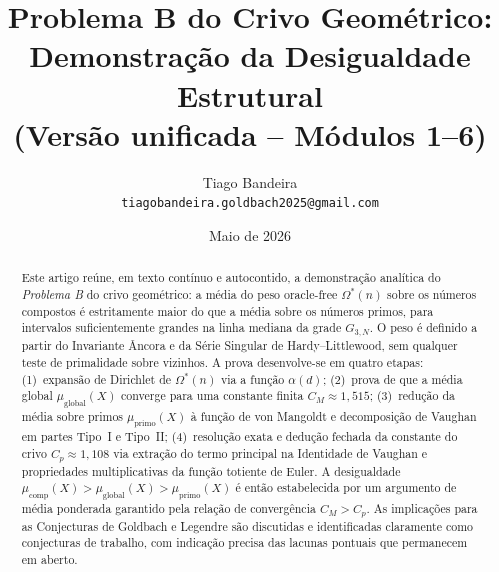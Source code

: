 \documentclass[12pt]{article}
\title{%
	Problema B do Crivo Geométrico:\\
	Demonstração da Desigualdade Estrutural\\[6pt]
	\large (Versão unificada – Módulos 1–6)
}
\author{Tiago Bandeira\\
	\texttt{tiagobandeira.goldbach2025@gmail.com}}
\date{Maio de 2026}
\theoremstyle{definition}
\theoremstyle{remark}
\newcommand{\Omstar}{\Omega^*}
\newcommand{\muglobal}{\mu_{\mathrm{global}}}
\newcommand{\muprimo}{\mu_{\mathrm{primo}}}
\newcommand{\mucomp}{\mu_{\mathrm{comp}}}
\begin{document}
	
	\maketitle
	
	\begin{center}
	\end{center}
	
	\bigskip
	
	\begin{abstract}
		Este artigo reúne, em texto contínuo e autocontido, a demonstração analítica
		do \emph{Problema B} do crivo geométrico: a média do peso oracle-free
		$\Omstar(n)$ sobre os números compostos é estritamente maior do que a média
		sobre os números primos, para intervalos suficientemente grandes na linha
		mediana da grade $G_{3,N}$.
		O peso é definido a partir do Invariante Âncora
		e da Série Singular de Hardy–Littlewood, sem qualquer teste de primalidade
		sobre vizinhos.
		A prova desenvolve-se em quatro etapas: (1)~expansão de Dirichlet de
		$\Omstar(n)$ via a função $\alpha(d)$;
		(2)~prova de que a média global $\muglobal(X)$ converge para uma constante 
		finita $C_M \approx 1{,}515$;
		(3)~redução da média sobre primos $\muprimo(X)$ à função de von Mangoldt
		e decomposição de Vaughan em partes Tipo~I e Tipo~II;
		(4)~resolução exata e dedução fechada da constante do crivo $C_p \approx 1{,}108$ via extração 
		do termo principal na Identidade de Vaughan e propriedades multiplicativas da função totiente de Euler.
		A desigualdade $\mucomp(X)>\muglobal(X)>\muprimo(X)$ é então estabelecida
		por um argumento de média ponderada garantido pela relação de convergência 
		$C_M > C_p$.
		As implicações para as Conjecturas de Goldbach e Legendre são 
		discutidas e identificadas claramente como conjecturas de trabalho, com 
		indicação precisa das lacunas pontuais que permanecem em aberto.
	\end{abstract}
	
\end{document}
